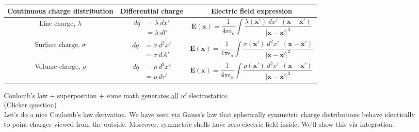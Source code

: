 \documentclass{article}
\numberwithin{equation}{section}
\begin{document}
\begin{table}[H]
\centering
{}
\begin{tabular}{@{}c|c|c@{}}
\toprule
Continuous charge distribution & Differential charge & Electric field expression \\ \midrule
Line charge, $\lambda$ & \parbox[c]{0.2\textwidth}{\begin{align*} dq &= \lambda\ dx' \\ &= \lambda\ dl' \end{align*}} & \parbox[c]{0.4\textwidth}{\begin{equation*} \bm{E}(\bm{x}) = \frac{1}{4\pi\epsilon_o} \int \frac{\lambda(\bm{x'})\ dx'\ \ \left( \bm{x} - \bm{x'} \right)}{\left| \bm{x} - \bm{x'} \right|^3} \end{equation*}} \\ \midrule
Surface charge, $\sigma$ & \parbox[c]{0.2\textwidth}{\begin{align*} dq &= \sigma\ d^2x' \\ &= \sigma\ dA' \end{align*}} & \parbox[c]{0.4\textwidth}{\begin{equation*} \bm{E}(\bm{x}) = \frac{1}{4\pi\epsilon_o} \int \frac{\sigma(\bm{x'})\ d^2x'\ \ \left( \bm{x} - \bm{x'} \right)}{\left| \bm{x} - \bm{x'} \right|^3} \end{equation*}} \\ \midrule
Volume charge, $\rho$ & \parbox[c]{0.2\textwidth}{\begin{align*} dq &= \rho\ d^3x' \\ &= \rho\ d\tau' \end{align*}} & \parbox[c]{0.4\textwidth}{\begin{equation*} \bm{E}(\bm{x}) = \frac{1}{4\pi\epsilon_o} \int \frac{\rho(\bm{x'})\ d^3x'\ \ \left( \bm{x} - \bm{x'} \right)}{\left| \bm{x} - \bm{x'} \right|^3} \end{equation*}} \\ \bottomrule
\end{tabular}
\label{tab:2:dq}
\end{table}


Coulomb's law + superposition + some math generates \underline{all} of electrostatics. \\

(Clicker question) \\

Let's do a nice Coulomb's law derivation. We have seen via Gauss's law that spherically symmetric charge distributions behave identically to point charges viewed from the outside. Moreover, symmetric shells have zero electric field inside. We'll show this via integration.
\end{document}

